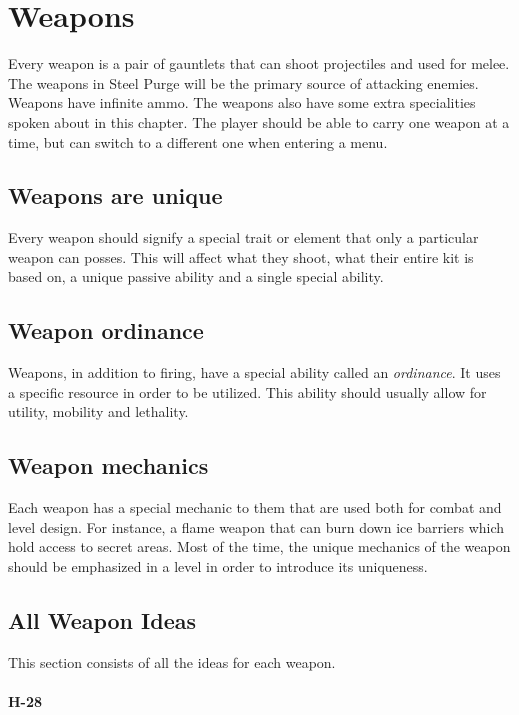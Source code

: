 \documentclass[../Main.tex]{subfiles}
\begin{document}
\section{Weapons}

Every weapon is a pair of gauntlets that can shoot projectiles and used for melee. The weapons in Steel Purge will be the primary source of attacking enemies. Weapons have infinite ammo. The weapons also have some extra specialities spoken about in this chapter. The player should be able to carry one weapon at a time, but can switch to a different one when entering a menu.

\subsection{Weapons are unique}

Every weapon should signify a special trait or element that only a particular weapon can posses. This will affect what they shoot, what their entire kit is based on, a unique passive ability and a single special ability. 

\subsection{Weapon ordinance}

Weapons, in addition to firing, have a special ability called an \emph{ordinance}. It uses a specific resource in order to be utilized. This ability should usually allow for utility, mobility and lethality.

\subsection{Weapon mechanics}

Each weapon has a special mechanic to them that are used both for combat and level design. For instance, a flame weapon that can burn down ice barriers which hold access to secret areas. Most of the time, the unique mechanics of the weapon should be emphasized in a level in order to introduce its uniqueness. 

\subsection{All Weapon Ideas}

This section consists of all the ideas for each weapon.

\paragraph{H-28}
\end{document}
